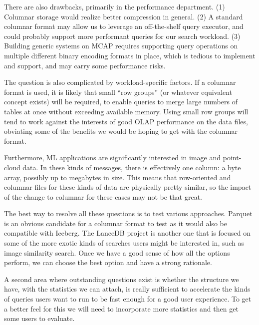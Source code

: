 \documentclass[9pt,twocolumn]{article}
\newcommand{\q}[1]{``#1''}
\begin{document}
    There are also drawbacks, primarily in the performance department. (1)
    Columnar storage would realize better compression in general. (2) A
    standard columnar format may allow us to leverage an off-the-shelf query
    executor, and could probably support more performant queries for our search
    workload. (3) Building generic systems on MCAP requires supporting query
    operations on multiple different binary encoding formats in place, which is
    tedious to implement and support, and may carry some performance risks.

    The question is also complicated by workload-specific factors. If a
    columnar format is used, it is likely that small \q{row groups} (or
    whatever equivalent concept exists) will be required, to enable queries to
    merge large numbers of tables at once without exceeding available memory.
    Using small row groups will tend to work against the interests of good OLAP
    performance on the data files, obviating some of the benefits we would be
    hoping to get with the columnar format.

    Furthermore, ML applications are significantly interested in image and
    point-cloud data. In these kinds of messages, there is effectively one
    column: a byte array, possibly up to megabytes in size. This means that
    row-oriented and columnar files for these kinds of data are physically
    pretty similar, so the impact of the change to columnar for these cases may
    not be that great.

    The best way to resolve all these questions is to test various approaches.
    Parquet is an obvious candidate for a columnar format to test as it would
    also be compatible with Iceberg. The LanceDB \cite{lance} project is
    another one that is focused on some of the more exotic kinds of searches
    users might be interested in, such as image similarity search. Once we have
    a good sense of how all the options perform, we can choose the best option
    and have a strong rationale.

    A second area where outstanding questions exist is whether the structure we
    have, with the statistics we can attach, is really sufficient to accelerate the
    kinds of queries users want to run to be fast enough for a good user
    experience. To get a better feel for this we will need to incorporate more
    statistics and then get some users to evaluate.
\end{document}
